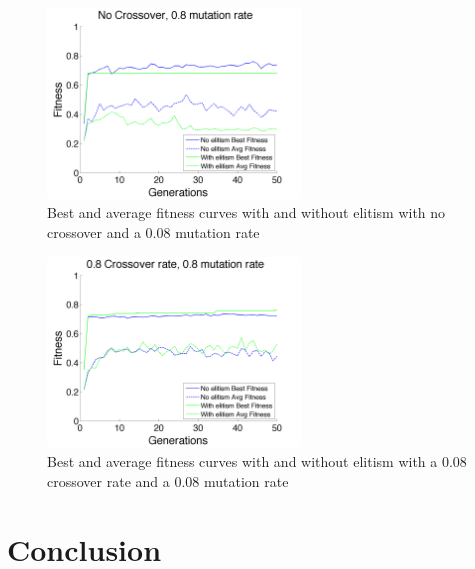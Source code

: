 \documentclass[11pt]{article}
\begin{document}
\begin{figure}[H]
 \centering
  \includegraphics[width=0.6\textwidth,height=0.2\textheight]{figures/fitness08mut0cross.png}
  \caption{Best and average fitness curves with and without elitism with no crossover and a 0.08 mutation rate}
  \label{fig:fig3}  
\end{figure}

\begin{figure}[H]
 \centering
  \includegraphics[width=0.6\textwidth,height=0.2\textheight]{figures/fitness08mut08cross.png}
  \caption{Best and average fitness curves with and without elitism with a 0.08 crossover rate and a 0.08 mutation rate}
  \label{fig:fig4}  
\end{figure}
\section{Conclusion}



\end{document}

